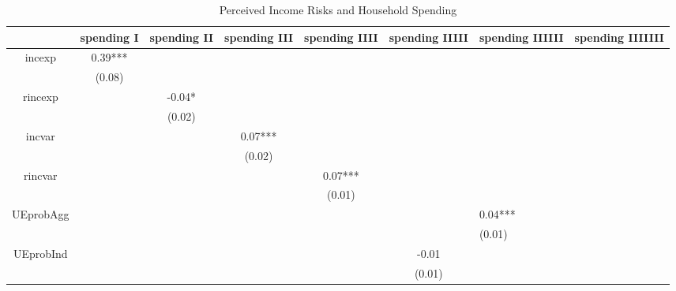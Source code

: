 \documentclass[12pt,notitlepage,onecolumn,aps,pra]{article}
\begin{document}
\begin{table}[p]
\centering
\begin{adjustbox}{width={0.9\textwidth}}
\begin{threeparttable}
\caption{Perceived Income Risks and Household Spending}
\label{spending_reg}
\begin{tabular}{ccccccll}
\hline 
{} & spending I & spending II & spending III & spending IIII & spending IIIII & spending IIIIII & spending IIIIIII \\
\hline 
incexp    &    0.39*** &             &              &               &                &                 &                  \\
&     (0.08) &             &              &               &                &                 &                  \\

rincexp   &            &      -0.04* &              &               &                &                 &                  \\
&            &      (0.02) &              &               &                &                 &                  \\
incvar    &            &             &      0.07*** &               &                &                 &                  \\
          &            &             &       (0.02) &               &                &                 &                  \\

rincvar   &            &             &              &       0.07*** &                &                 &                  \\
          &            &             &              &        (0.01) &                &                 &                  \\
          
          UEprobAgg &            &             &              &               &                &         0.04*** &                  \\
          &            &             &              &               &                &          (0.01) &                  \\
          UEprobInd &            &             &              &               &          -0.01 &                 &                  \\
          &            &             &              &               &         (0.01) &                 &                  \\
          

\end{tabular}
\end{threeparttable}
\end{adjustbox}
\end{table}
\end{document}
